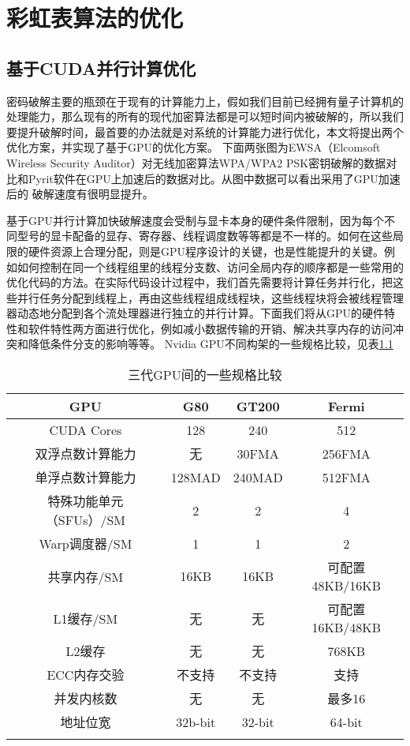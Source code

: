 \chapter{彩虹表算法的优化}
\section{基于CUDA并行计算优化}
密码破解主要的瓶颈在于现有的计算能力上，假如我们目前已经拥有量子计算机的处理能力，那么现有的所有的现代加密算法都是可以短时间内被破解的，所以我们要提升破解时间，最首要的办法就是对系统的计算能力进行优化，本文将提出两个优化方案，并实现了基于GPU的优化方案。
下面两张图为EWSA（Elcomsoft Wireless Security Auditor）对无线加密算法WPA/WPA2 PSK密钥破解的数据对比和Pyrit软件在GPU上加速后的数据对比。从图中数据可以看出采用了GPU加速后的
破解速度有很明显提升。
\begin{figure}[!h]
\begin{floatrow}
\end{floatrow}
\end{figure}

基于GPU并行计算加快破解速度会受制与显卡本身的硬件条件限制，因为每个不同型号的显卡配备的显存、寄存器、线程调度数等等都是不一样的。如何在这些局限的硬件资源上合理分配，则是GPU程序设计的关键，也是性能提升的关键。例如如何控制在同一个线程组里的线程分支数、访问全局内存的顺序都是一些常用的优化代码的方法。在实际代码设计过程中，我们首先需要将计算任务并行化，把这些并行任务分配到线程上，再由这些线程组成线程块，这些线程块将会被线程管理器动态地分配到各个流处理器进行独立的并行计算。下面我们将从GPU的硬件特性和软件特性两方面进行优化，例如减小数据传输的开销、解决共享内存的访问冲突和降低条件分支的影响等等\cite{cuda01}。
Nvidia GPU不同构架的一些规格比较，见表\ref{tab:5.2}
\begin{longtable}{@{\extracolsep{\fill}}cccc}
\caption{三代GPU间的一些规格比较}\\\toprule[1pt]
\multicolumn{1}{c}{GPU} &
\multicolumn{1}{c}{G80} &
\multicolumn{1}{c}{GT200} &
\multicolumn{1}{c}{Fermi} \\\midrule
CUDA Cores & 128 & 240 & 512 \\
双浮点数计算能力 & 无 & 30FMA & 256FMA \\
单浮点数计算能力 & 128MAD & 240MAD  & 512FMA \\
特殊功能单元（SFUs）/SM & 2 & 2 & 4 \\
Warp调度器/SM & 1 & 1 & 2 \\
共享内存/SM & 16KB & 16KB & 可配置48KB/16KB \\
L1缓存/SM & 无 & 无 & 可配置16KB/48KB \\
L2缓存 & 无 & 无 & 768KB \\
ECC内存交验 & 不支持 & 不支持 & 支持 \\
并发内核数 & 无 & 无 & 最多16 \\
地址位宽 & 32b-bit & 32-bit & 64-bit \\
\bottomrule[1pt]
\label{tab:5.2}
\end{longtable}
